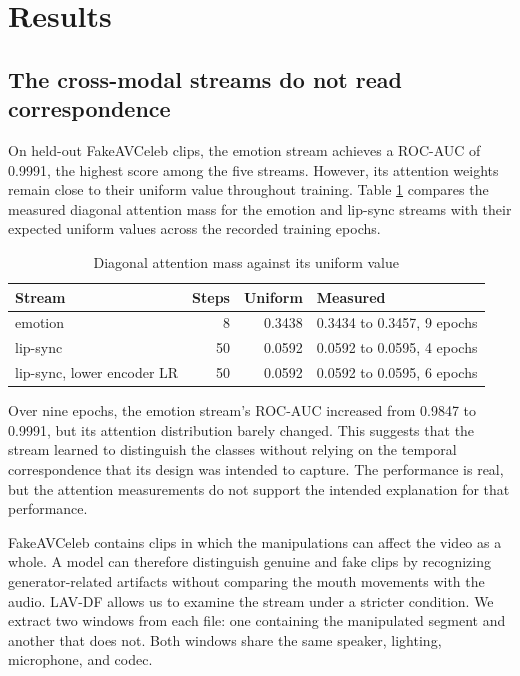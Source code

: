 \documentclass[conference]{IEEEtran}
\begin{document}
\section{Results}

\subsection{The cross-modal streams do not read correspondence}

On held-out FakeAVCeleb clips, the emotion stream achieves a ROC-AUC of
0.9991, the highest score among the five streams. However, its attention
weights remain close to their uniform value throughout training. Table
\ref{tab:diag} compares the measured diagonal attention mass for the emotion
and lip-sync streams with their expected uniform values across the recorded
training epochs.

\begin{table}[htbp]
\caption{Diagonal attention mass against its uniform value}
\label{tab:diag}
\centering
\begin{tabular}{lrrl}
\toprule
Stream & Steps & Uniform & Measured \\
\midrule
emotion & 8 & 0.3438 & 0.3434 to 0.3457, 9 epochs \\
lip-sync & 50 & 0.0592 & 0.0592 to 0.0595, 4 epochs \\
lip-sync, lower encoder LR & 50 & 0.0592 & 0.0592 to 0.0595, 6 epochs \\
\bottomrule
\end{tabular}
\end{table}

Over nine epochs, the emotion stream's ROC-AUC increased from 0.9847 to
0.9991, but its attention distribution barely changed. This suggests that the
stream learned to distinguish the classes without relying on the temporal
correspondence that its design was intended to capture. The performance is
real, but the attention measurements do not support the intended explanation
for that performance.

FakeAVCeleb contains clips in which the manipulations can affect the video
as a whole. A model can therefore distinguish genuine and fake clips by
recognizing generator-related artifacts without comparing the mouth movements
with the audio. LAV-DF allows us to examine the stream under a stricter
condition. We extract two windows from each file: one containing the
manipulated segment and another that does not. Both windows share the same
speaker, lighting, microphone, and codec.
\end{document}
